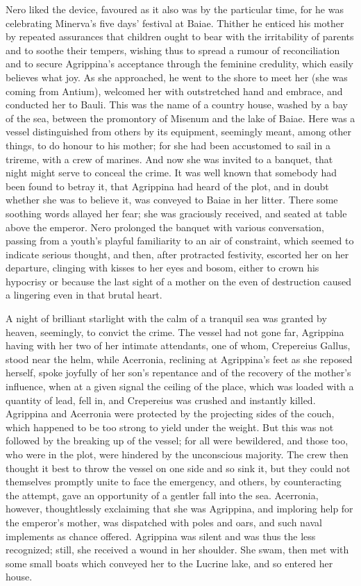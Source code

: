 Nero liked the device, favoured as it also was by the particular time, for he was celebrating Minerva's five days' festival at Baiae. Thither he enticed his mother by repeated assurances that children ought to bear with the irritability of parents and to soothe their tempers, wishing thus to spread a rumour of reconciliation and to secure Agrippina's acceptance through the feminine credulity, which easily believes what joy. As she approached, he went to the shore to meet her (she was coming from Antium), welcomed her with outstretched hand and embrace, and conducted her to Bauli. This was the name of a country house, washed by a bay of the sea, between the promontory of Misenum and the lake of Baiae. Here was a vessel distinguished from others by its equipment, seemingly meant, among other things, to do honour to his mother; for she had been accustomed to sail in a trireme, with a crew of marines. And now she was invited to a banquet, that night might serve to conceal the crime. It was well known that somebody had been found to betray it, that Agrippina had heard of the plot, and in doubt whether she was to believe it, was conveyed to Baiae in her litter. There some soothing words allayed her fear; she was graciously received, and seated at table above the emperor. Nero prolonged the banquet with various conversation, passing from a youth's playful familiarity to an air of constraint, which seemed to indicate serious thought, and then, after protracted festivity, escorted her on her departure, clinging with kisses to her eyes and bosom, either to crown his hypocrisy or because the last sight of a mother on the even of destruction caused a lingering even in that brutal heart.


A night of brilliant starlight with the calm of a tranquil sea was granted by heaven, seemingly, to convict the crime. The vessel had not gone far, Agrippina having with her two of her intimate attendants, one of whom, Crepereius Gallus, stood near the helm, while Acerronia, reclining at Agrippina's feet as she reposed herself, spoke joyfully of her son's repentance and of the recovery of the mother's influence, when at a given signal the ceiling of the place, which was loaded with a quantity of lead, fell in, and Crepereius was crushed and instantly killed. Agrippina and Acerronia were protected by the projecting sides of the couch, which happened to be too strong to yield under the weight. But this was not followed by the breaking up of the vessel; for all were bewildered, and those too, who were in the plot, were hindered by the unconscious majority. The crew then thought it best to throw the vessel on one side and so sink it, but they could not themselves promptly unite to face the emergency, and others, by counteracting the attempt, gave an opportunity of a gentler fall into the sea. Acerronia, however, thoughtlessly exclaiming that she was Agrippina, and imploring help for the emperor's mother, was dispatched with poles and oars, and such naval implements as chance offered. Agrippina was silent and was thus the less recognized; still, she received a wound in her shoulder. She swam, then met with some small boats which conveyed her to the Lucrine lake, and so entered her house.

